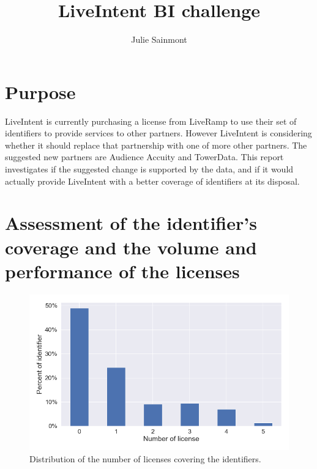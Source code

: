 \documentclass[11pt]{article} %
\title{LiveIntent BI challenge}
\author{Julie Sainmont}
\begin{document}
\maketitle

\section{Purpose}
LiveIntent is currently purchasing a license from LiveRamp to use their set of identifiers to provide services to other partners. However LiveIntent is considering whether it should replace that partnership with one of more other partners. The suggested new partners are Audience Accuity and TowerData. This report investigates if the suggested change is supported by the data, and if it would actually provide LiveIntent with a better coverage of identifiers at its disposal. \\

\section{Assessment of the identifier's coverage and the volume and performance of the licenses}
\begin{figure}[h!]
  \includegraphics[width=0.8\linewidth]{../outputs/distribution_identifier_license.png}
  \caption{Distribution of the number of licenses covering the identifiers.}
  \label{fig:nr_licences_per_identifier}
\end{figure}
\end{document}
